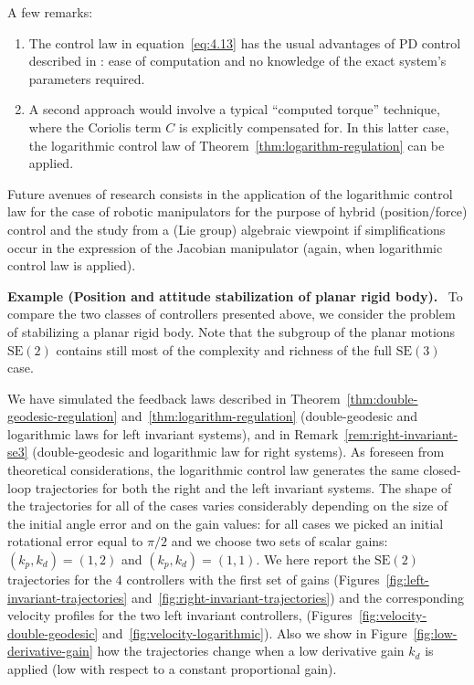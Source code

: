 \documentclass[11pt]{article}
\newcommand{\SE}{\mathrm{SE}}
\newcounter{paperexample}
\renewcommand{\thepaperexample}{\arabic{paperexample}}
\newcommand{\paperexample}[2]{\refstepcounter{paperexample}\par\medskip\noindent\textbf{Example \thepaperexample#1.}\label{#2}\ }
\begin{document}
A few remarks:
\begin{enumerate}
\item The control law in equation~\eqref{eq:4.13} has the usual advantages of PD control described in \cite{26}: ease of computation and no knowledge of the exact system's parameters required.
\item A second approach would involve a typical ``computed torque'' technique, where the Coriolis term $C$ is explicitly compensated for. In this latter case, the logarithmic control law of Theorem~\ref{thm:logarithm-regulation} can be applied.
\end{enumerate}
Future avenues of research consists in the application of the logarithmic control law for the case of robotic manipulators for the purpose of hybrid (position/force) control and the study from a (Lie group) algebraic viewpoint if simplifications occur in the expression of the Jacobian manipulator (again, when logarithmic control law is applied).

\paperexample{ (Position and attitude stabilization of planar rigid body)}{ex:planar-stabilization} To compare the two classes of controllers presented above, we consider the problem of stabilizing a planar rigid body. Note that the subgroup of the planar motions $\SE(2)$ contains still most of the complexity and richness of the full $\SE(3)$ case.

We have simulated the feedback laws described in Theorem~\ref{thm:double-geodesic-regulation} and~\ref{thm:logarithm-regulation} (double-geodesic and logarithmic laws for left invariant systems), and in Remark~\ref{rem:right-invariant-se3} (double-geodesic and logarithmic law for right systems). As foreseen from theoretical considerations, the logarithmic control law generates the same closed-loop trajectories for both the right and the left invariant systems. The shape of the trajectories for all of the cases varies considerably depending on the size of the initial angle error and on the gain values: for all cases we picked an initial rotational error equal to $\pi/2$ and we choose two sets of scalar gains: $(k_p,k_d)=(1,2)$ and $(k_p,k_d)=(1,1)$. We here report the $\SE(2)$ trajectories for the 4 controllers with the first set of gains (Figures~\ref{fig:left-invariant-trajectories} and~\ref{fig:right-invariant-trajectories}) and the corresponding velocity profiles for the two left invariant controllers, (Figures~\ref{fig:velocity-double-geodesic} and~\ref{fig:velocity-logarithmic}). Also we show in Figure~\ref{fig:low-derivative-gain} how the trajectories change when a low derivative gain $k_d$ is applied (low with respect to a constant proportional gain).
\end{document}
